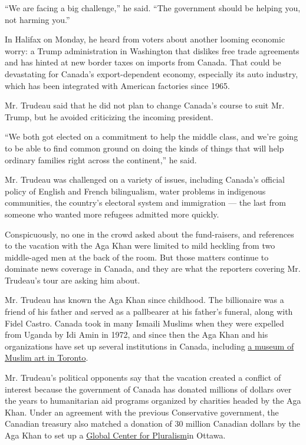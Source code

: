 ``We are facing a big challenge,'' he said. ``The government should be
helping you, not harming you.''

In Halifax on Monday, he heard from voters about another looming
economic worry: a Trump administration in Washington that dislikes free
trade agreements and has hinted at new border taxes on imports from
Canada. That could be devastating for Canada's export-dependent economy,
especially its auto industry, which has been integrated with American
factories since 1965.

Mr. Trudeau said that he did not plan to change Canada's course to suit
Mr. Trump, but he avoided criticizing the incoming president.

``We both got elected on a commitment to help the middle class, and
we're going to be able to find common ground on doing the kinds of
things that will help ordinary families right across the continent,'' he
said.

Mr. Trudeau was challenged on a variety of issues, including Canada's
official policy of English and French bilingualism, water problems in
indigenous communities, the country's electoral system and immigration
--- the last from someone who wanted more refugees admitted more
quickly.

Conspicuously, no one in the crowd asked about the fund-raisers, and
references to the vacation with the Aga Khan were limited to mild
heckling from two middle-aged men at the back of the room. But those
matters continue to dominate news coverage in Canada, and they are what
the reporters covering Mr. Trudeau's tour are asking him about.

Mr. Trudeau has known the Aga Khan since childhood. The billionaire was
a friend of his father and served as a pallbearer at his father's
funeral, along with Fidel Castro. Canada took in many Ismaili Muslims
when they were expelled from Uganda by Idi Amin in 1972, and since then
the Aga Khan and his organizations have set up several institutions in
Canada, including
\href{http://www.akdn.org/where-we-work/north-america/canada/aga-khan-museum}{a
museum of Muslim art in Toronto}.

Mr. Trudeau's political opponents say that the vacation created a
conflict of interest because the government of Canada has donated
millions of dollars over the years to humanitarian aid programs
organized by charities headed by the Aga Khan. Under an agreement with
the previous Conservative government, the Canadian treasury also matched
a donation of 30 million Canadian dollars by the Aga Khan to set up a
\href{http://www.akdn.org/where-we-work/north-america/canada/global-centre-pluralism}{Global
Center for Pluralism}in Ottawa.

